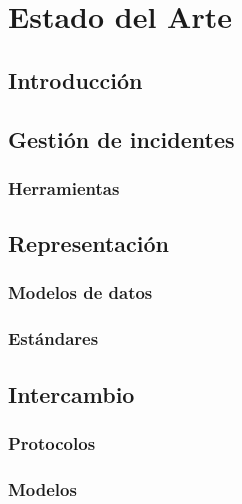 \chapter{Estado del Arte}
\label{capitulo2}

\section{Introducción}
\label{introduccion}


\section{Gestión de incidentes}
\label{gestiondeincidentes}
\subsection{Herramientas}
\label{herramientas}


\section{Representación}
\label{representacion}
\subsection{Modelos de datos}
\label{modelodedatos}



%


\subsection{Estándares}
\label{estandares}
\section{Intercambio}
\label{intercambio}
\subsection{Protocolos}
\label{protocolos}
 
 
\subsection{Modelos}
\label{modelos}
 
